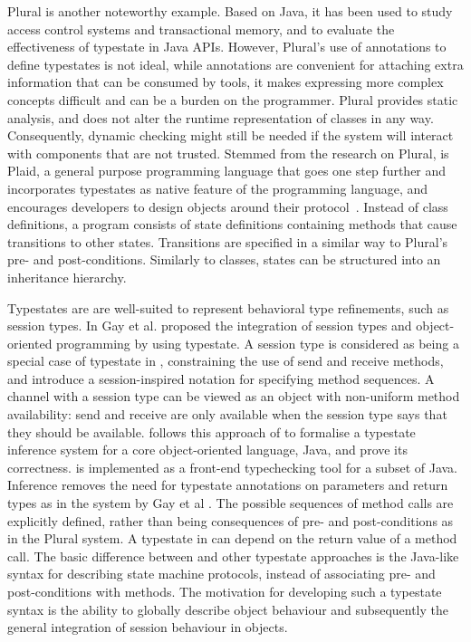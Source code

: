 Plural\cite{Bierhoff.etal:practicalapichecking} is another noteworthy example. Based on Java, it has been used to study access control systems\cite{BierhoffAldrich:aliasedobjects} and transactional memory\cite{Beckman.etal:atomicblockstypestates}, and to evaluate the effectiveness of typestate in Java APIs\cite{Bierhoff.etal:practicalapichecking}. However, Plural's use of annotations to define typestates is not ideal, while annotations are convenient for attaching extra information that can be consumed by tools, it makes expressing more complex concepts difficult and can be a burden on the programmer. Plural provides static analysis, and does not alter the runtime representation of classes in any way. Consequently, dynamic checking might still be needed if the system will interact with components that are not trusted. Stemmed from the research on Plural, is Plaid, a general purpose programming language that goes one step further and incorporates typestates as native feature of the programming language, and encourages developers  to design objects around their protocol~\cite{DBLP:conf/oopsla/AldrichSSS09,DBLP:conf/oopsla/SunshineNSAT11}. Instead of class definitions,
a program consists of state definitions containing methods that cause
transitions to other states. Transitions are specified in a similar way
to Plural's pre- and post-conditions. Similarly to classes, states can be structured into an inheritance hierarchy.


Typestates are are well-suited to represent behavioral type refinements, such as session types. In \cite{gay.vasconcelos.etal_modular-session-types} Gay et al. proposed the integration of session types and object-oriented programming by using typestate. A session type is considered as being a special case of typestate in \cite{gay.vasconcelos.etal_modular-session-types}, constraining the use of send and receive methods, and introduce a session-inspired notation for specifying method sequences. A  channel with a session type can be viewed as an object with non-uniform method availability: send and receive are only available when the session type says that they should be available. \Mungo \cite{kouzapas16} follows this approach of \cite{gay.vasconcelos.etal_modular-session-types} to formalise a typestate inference system for a core object-oriented language, Java, and prove its correctness. \Mungo is implemented as a front-end typechecking tool for a subset of Java. Inference removes the need for typestate annotations on parameters and return types as in the system by Gay et al \cite{gay.vasconcelos.etal_modular-session-types}. The possible sequences of method calls are explicitly defined, rather than being consequences of pre- and post-conditions as in the Plural system. A typestate in \Mungo can depend on the return value of a method call. The basic difference between \Mungo and other typestate approaches is the Java-like syntax for describing state machine protocols, instead of associating pre- and post-conditions with methods. The motivation for developing such a typestate syntax is the ability to globally describe object behaviour and subsequently the general integration of session behaviour in objects.


